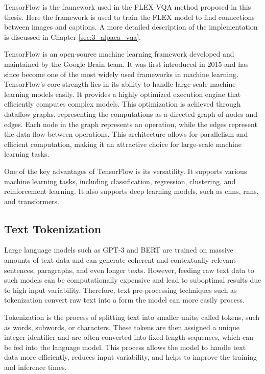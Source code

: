     TensorFlow is the framework used in the FLEX-VQA method proposed in this thesis. Here the framework is used to train the FLEX model to find connections between images and captions. A more detailed description of the implementation is discussed in Chapter \ref{sec:3_alpaca_vqa}.

    
    TensorFlow is an open-source machine learning framework developed and maintained by the Google Brain team. It was first introduced in 2015 and has since become one of the most widely used frameworks in machine learning.
    TensorFlow's core strength lies in its ability to handle large-scale machine learning models easily. It provides a highly optimized execution engine that efficiently computes complex models. This optimization is achieved through dataflow graphs, representing the computations as a directed graph of nodes and edges. Each node in the graph represents an operation, while the edges represent the data flow between operations. This architecture allows for parallelism and efficient computation, making it an attractive choice for large-scale machine learning tasks.
    
    One of the key advantages of TensorFlow is its versatility. It supports various machine learning tasks, including classification, regression, clustering, and reinforcement learning. It also supports deep learning models, such as \glspl{cnn}, \glspl{rnn}, and transformers.

    

    \subsection{Text Tokenization}
    \label{sec2:text_tokenization}

    Large language models such as GPT-3 \cite{brownLanguageModelsAre2020} and BERT \cite{devlinBERTPretrainingDeep2019} are trained on massive amounts of text data and can generate coherent and contextually relevant sentences, paragraphs, and even longer texts. However, feeding raw text data to such models can be computationally expensive and lead to suboptimal results due to high input variability. Therefore, text pre-processing techniques such as tokenization convert raw text into a form the model can more easily process.
    
    Tokenization is the process of splitting text into smaller units, called tokens, such as words, subwords, or characters. These tokens are then assigned a unique integer identifier and are often converted into fixed-length sequences, which can be fed into the language model. This process allows the model to handle text data more efficiently, reduces input variability, and helps to improve the training and inference times.
    
